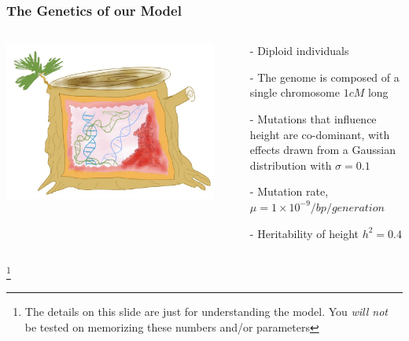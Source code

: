 \documentclass[xcolor=dvipsnames]{beamer}
\newcommand\blfootnote[1]{%
	\begingroup
	\renewcommand\thefootnote{}\footnote{#1}%
	\addtocounter{footnote}{-1}%
	\endgroup
}
\begin{document}
\begin{frame}
	\frametitle{	The Genetics of our Model }
	\begin{columns}
		\begin{column}{0.5\textwidth}
			\includegraphics[keepaspectratio, width  = \textwidth]{img/treeGuts}
		\end{column}
		\begin{column}{0.6\textwidth}
			\begin{itemize}
				\item[-] Diploid individuals \pause
				\item[-] The genome is composed of a single chromosome $1cM$ long \pause
				\item[-] Mutations that influence height are co-dominant, with effects drawn from a Gaussian distribution with $\sigma=0.1$ \pause
				\item[-] Mutation rate, $\mu=1\times10^{-9}/bp/generation$ \pause
				\item[-] Heritability of height $h^2=0.4$
			\end{itemize}
		\end{column}
	\end{columns}
\blfootnote{The details on this slide are just for understanding the model. You \textit{will not} be tested on memorizing these numbers and/or parameters}	
\end{frame}
\end{document}
